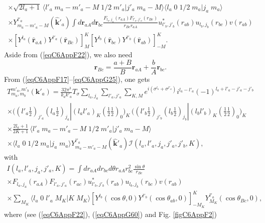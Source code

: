 \begin{subappendices}
\begin{multline}
\times \sqrt{2l_a+1}\,\langle l'_a\;m_a-m'_a-M\;1/2\;m'_a|j'_a\;m_a-M\rangle \langle l_a\;0\;1/2\;m_a|j_a\;m_a\rangle\\
\times Y^{l'_a}_{m_a-m'_a-M} (\hat {\mathbf{k}}'_a)
\int d\mathbf{r}_{aA}d \mathbf{r}_{bc}\frac{F_{l_a,j_a}(r_{aA})  F_{l'_a,j'_a}(r_{Bc})}{r_{Bc}r_{aA}}u^*_{l'_b,j'_b}(r_{ab})u_{l_b,j_b}(r_{bc})v(r_{ab})\\
\times\left[ Y^{l_a} (\hat{\mathbf r}_{aA}) Y^{l'_a} (\hat{ \mathbf r}_{Bc})\right]^K_{M}   \left[ Y^{l_b} (\hat{\mathbf r}_{bc}) Y^{l'_b} (\hat{\mathbf r}_{ab})\right]^{K}_{-M}.
\end{multline}
Aside from (\ref{eqC6AppF22}), we also need 
\begin{equation}\label{eqC6AppG60}
\mathbf{r}_{Bc}=\frac{a+B}{B}\mathbf{r}_{aA}+\frac{b}{A}\mathbf{r}_{bc}.
\end{equation}
From (\ref{eqC6AppF17}--\ref{eqC6AppG25}), one gets
\begin{multline}\label{eqC6AppG61}
T_{m_a,m_b}^{m'_a,m'_b}(\mathbf{k}'_a)=\frac{32\pi^{3}}{k_ak'_a}T_{\sigma}\sum_{l_a,j_a}\sum_{l'_a,j'_a}\sum_{K,M}
 e^{i(\sigma^{l_a}+\sigma^{l'_a})}i^{l_a-l'_a}(-1)^{l_a+l'_a-j'_a-j'_b}\\
 \times\bigl((l'_a \tfrac{1}{2})_{j'_a}(l_a \tfrac{1}{2})_{j_a}|(l_a l'_a)_K(\tfrac{1}{2} \tfrac{1}{2})_0\bigr)_K\,\bigl((l'_b \tfrac{1}{2})_{j'_b}(l_b \tfrac{1}{2})_{j_b}|(l_b l'_b)_{K}(\tfrac{1}{2} \tfrac{1}{2})_0\bigr)_{K}\\
\times \frac{2l_a+1}{2K+1}\,\langle l'_a\;m_a-m'_a-M\;1/2\;m'_a|j'_a\;m_a-M\rangle\\ \times\langle l_a\;0\;1/2\;m_a|j_a\;m_a\rangle
 Y^{l'_a}_{m_a-m'_a-M} (\hat {\mathbf{k}}'_a)
\mathcal I(l_a,l'_a,j_a,j'_a,j'_b,K),
\end{multline}
with
\begin{multline}\label{eqC6AppG62}
I(l_a,l'_a,j_a,j'_a,K)=\int dr_{aA} dr_{bc}d\theta r_{aA}r^2_{bc} \frac{\sin \theta}{r_{Bc}}\\
\times F_{l_a,j_a}(r_{aA})  F_{l'_a,j'_a}(r_{ac})u^*_{l'_b,j'_b}(r_{ab}) u_{l_b,j_b}(r_{bc})v(r_{ab}) \\
\times \sum_{M_K} \langle l_a\;0\;l'_a\;M_K|K\;M_K\rangle \left[ Y^{l_b} (\cos \theta,0) Y^{l'_b} (\cos \theta_{ab},0)\right]^{K}_{-M_K} Y^{l'_a}_{M_K} (\cos \theta_{Bc},0),
\end{multline}
where (see (\ref{eqC6AppF22}), (\ref{eqC6AppG60}) and Fig. \ref{figC6AppF2})


\end{subappendices}
